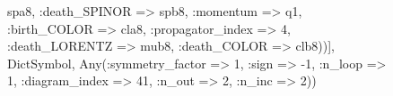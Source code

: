 \documentclass{revtex4}
\begin{document}
\begin{figure}[!htb]
\begin{center}
{spa8, :death_SPINOR => spb8, :momentum => q1, :birth_COLOR => cla8, :propagator_index => 4, :death_LORENTZ => mub8, :death_COLOR => clb8))], Dict{Symbol, Any}(:symmetry_factor => 1, :sign => -1, :n_loop => 1, :diagram_index => 41, :n_out => 2, :n_inc => 2)) 
}
\end{center}
\end{figure}
\end{document}
